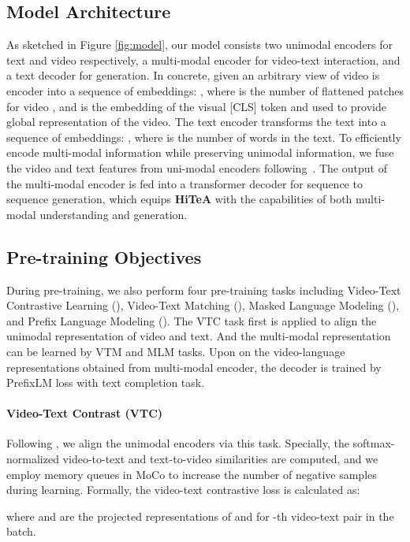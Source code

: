 \documentclass[10pt,twocolumn,letterpaper]{article}
\newcommand{\modelname}{\textbf{HiTeA}\xspace}
\begin{document}
\subsection{Model Architecture}
As sketched in Figure \ref{fig:model}, our model consists two unimodal encoders for text and video respectively, a multi-modal encoder for video-text interaction, and a text decoder for generation. In concrete, given an arbitrary view of video  is encoder into a sequence of embeddings: , where  is the number of flattened patches for video , and  is the embedding of the visual [CLS] token and used to provide global representation of the video. The text encoder transforms the text into a sequence of embeddings: , where  is the number of words in the text. To efficiently encode multi-modal information while preserving unimodal information, we fuse the video and text features from uni-modal encoders following~\cite{li2022mplug}. The output of the multi-modal encoder  is fed into a transformer decoder for sequence to sequence generation, which equips \modelname with the capabilities of both multi-modal understanding and generation. 

\subsection{Pre-training Objectives}
During pre-training, we also perform four pre-training tasks including Video-Text Contrastive Learning (), Video-Text Matching (), Masked Language Modeling (), and Prefix Language Modeling (). The VTC task first is applied to align the unimodal representation of video and text. And the multi-modal representation can be learned by VTM and MLM tasks. Upon on the video-language representations obtained from multi-modal encoder, the decoder is trained by PrefixLM loss with text completion task.
\paragraph{Video-Text Contrast (VTC)}
Following \cite{li2022alpro, wang2022allinone}, we align the unimodal encoders via this task. Specially, the softmax-normalized video-to-text and text-to-video similarities are computed, and we employ memory queues in MoCo \cite{chen2021moco} to increase the number of negative samples during learning. 
Formally, the video-text contrastive loss is calculated as:

where  and  are the projected representations of  and  for -th video-text pair in the batch.
\end{document}
